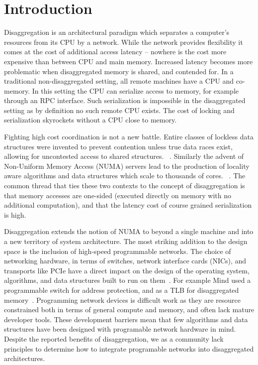 \section{Introduction}

Disaggregation is an architectural paradigm which separates a computer's
resources from its CPU by a network. While the network provides flexibility it
comes at the cost of additional access latency
-- nowhere is the cost more expensive than between CPU and main memory.
Increased latency becomes more problematic when disaggregated memory is shared,
and contended for. In a traditional non-disaggregated setting, all remote
machines have a CPU and co-memory. In this setting the CPU can serialize access
to memory, for example through an RPC interface.  Such serialization is
impossible in the disaggregated setting as by definition no such remote CPU
exists. The cost of locking and serialization skyrockets without a CPU close to
memory.

Fighting high cost coordination is not a new battle. Entire classes of lockless
data structures were invented to prevent contention unless true data races
exist, allowing for uncontested access to shared structures.
~\cite{simple-fast,lock-free-skip,non-block-binary,read-concur-btree,lock-free-btree}.
Similarly the advent of Non-Uniform Memory Access (NUMA) servers lead to the
production of locality aware algorithms and data structures which scale to
thousands of cores.  ~\cite{linux-scale,black-box-numa}. The common thread that
ties these two contexts to the concept of disaggregation is that memory accesses
are one-sided (executed directly on memory with no additional computation), and
that the latency cost of course grained serialization is high.

Disaggregation extends the notion of NUMA to beyond a single machine and into a
new territory of system architecture. The most striking addition to the design
space is the inclusion of high-speed programmable networks. The choice of
networking hardware, in terms of switches, network interface cards (NICs), and
transports like PCIe have a direct impact on the design of the operating system,
algorithms, and data structures built to run on
them~\cite{dredbox,firebox,machine,legoos,supernic}.  For example Mind used a
programmable switch for address protection, and as a TLB for disaggregated
memory~\cite{mind}.  Programming network devices is difficult work as they are
resource constrained both in terms of general compute and memory, and often lack
mature developer tools. These development barriers mean that few algorithms and
data structures have been designed with programable network hardware in mind.
Despite the reported benefits of disaggregation, we as a community lack
principles to determine how to integrate programable networks into disaggregated
architectures.

